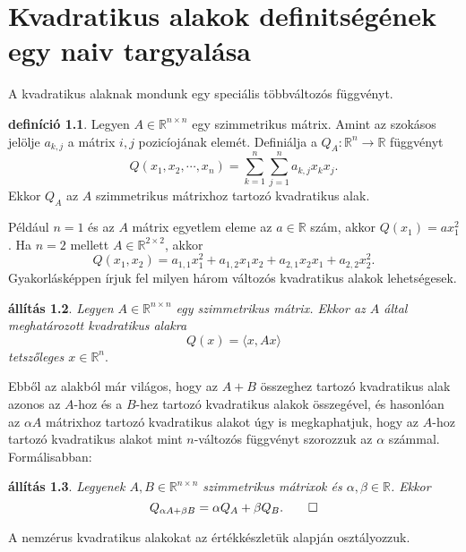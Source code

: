 \documentclass[9pt, a4paper, showtrims]{memoir}
\theoremstyle{plain}
\newtheorem{proposition}{állítás}[chapter]
\theoremstyle{remark}
\theoremstyle{definition}
\newtheorem{definition}[proposition]{definíció}
\newcommand{\ip}[2]{\langle#1,#2\rangle}
\begin{document}
\chapter{Kvadratikus alakok definitségének egy naiv targyalása}
A kvadratikus alaknak mondunk egy speciális többváltozós függvényt.
\begin{definition}
    Legyen $A\in\mathbb{R}^{n\times n}$ egy szimmetrikus mátrix.
    Amint az szokásos jelölje $a_{k,j}$ a mátrix $i,j$ pozicíojának elemét.
    Definiálja a $Q_A:\mathbb{R}^n\to\mathbb{R}$ függvényt
    \[
    Q\left( x_{1},x_2,\cdots,x_n \right)=
    \sum_{k=1}^n\sum_{j=1}^na_{k,j}x_kx_j.
    \]
    Ekkor $Q_A$ az $A$ szimmetrikus mátrixhoz tartozó kvadratikus alak.
\end{definition}
Például $n=1$ és az $A$ mátrix egyetlem eleme az $a\in\mathbb{R}$ szám, akkor $Q(x_1)=ax_1^2$.
Ha $n=2$ mellett $A\in\mathbb{R}^{2\times 2}$, akkor
$$
Q\left( x_1,x_2 \right)=a_{1,1}x_1^2+a_{1,2}x_1x_2+a_{2,1}x_2x_1+a_{2,2}x_2^2.
$$
Gyakorlásképpen írjuk fel milyen három változós kvadratikus alakok lehetségesek.
\begin{proposition}
    Legyen $A\in\mathbb{R}^{n\times n}$ egy szimmetrikus mátrix.
    Ekkor az $A$ által meghatározott kvadratikus alakra
    \[
        Q(x)=\ip{x}{Ax}
    \]
    tetszőleges $x\in\mathbb{R}^n.$
\end{proposition}
Ebből az alakból már világos, hogy az $A+B$ összeghez tartozó kvadratikus alak azonos az $A$-hoz és a $B$-hez
tartozó kvadratikus alakok összegével, 
és hasonlóan az $\alpha A$ mátrixhoz tartozó kvadratikus alakot úgy is megkaphatjuk, hogy az $A$-hoz tartozó kvadratikus alakot mint $n$-változós függvényt szorozzuk az $\alpha$ számmal.
Formálisabban:
\begin{proposition}
    Legyenek $A,B\in\mathbb{R}^{n\times n}$ szimmetrikus mátrixok és $\alpha,\beta\in\mathbb{R}$.
    Ekkor
    \[
    Q_{\alpha A+\beta B}=\alpha Q_A+\beta Q_B.
    \qedhere
    \]
\end{proposition}
A nemzérus kvadratikus alakokat az értékkészletük alapján osztályozzuk.
\end{document}
